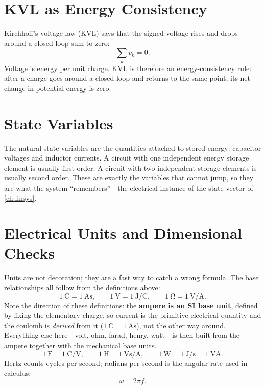 \section{KVL as Energy Consistency}
Kirchhoff's voltage law (KVL) says that the signed voltage rises and drops around a
closed loop sum to zero:
\[
\sum_k v_k=0.
\]
Voltage is energy per unit charge. KVL is therefore an energy-consistency rule:
after a charge goes around a closed loop and returns to the same point, its net
change in potential energy is zero.

\section{State Variables}
The natural state variables are the quantities attached to stored energy:
capacitor voltages and inductor currents. A circuit with one independent energy
storage element is usually first order. A circuit with two independent storage
elements is usually second order. These are exactly the variables that cannot jump,
so they are what the system ``remembers''---the electrical instance of the state
vector of \cref{ch:linsys}.

\section{Electrical Units and Dimensional Checks}
Units are not decoration; they are a fast way to catch a wrong formula. The base
relationships all follow from the definitions above:
\[
\SI{1}{\coulomb}=\SI{1}{\ampere\second},
\qquad
\SI{1}{\volt}=\SI{1}{\joule\per\coulomb},
\qquad
\SI{1}{\ohm}=\SI{1}{\volt\per\ampere}.
\]
Note the direction of these definitions: the \textbf{ampere is an SI base unit},
defined by fixing the elementary charge, so current is the primitive electrical
quantity and the coulomb is \emph{derived} from it (\(\SI{1}{\coulomb}
=\SI{1}{\ampere\second}\)), not the other way around. Everything else here---volt,
ohm, farad, henry, watt---is then built from the ampere together with the mechanical
base units.
\[
\SI{1}{\farad}=\SI{1}{\coulomb\per\volt},
\qquad
\SI{1}{\henry}=\SI{1}{\volt\second\per\ampere},
\qquad
\SI{1}{\watt}=\SI{1}{\joule\per\second}=\SI{1}{\volt\ampere}.
\]
Hertz counts cycles per second; radians per second is the angular rate used in
calculus:
\[
\omega=2\pi f.
\]

